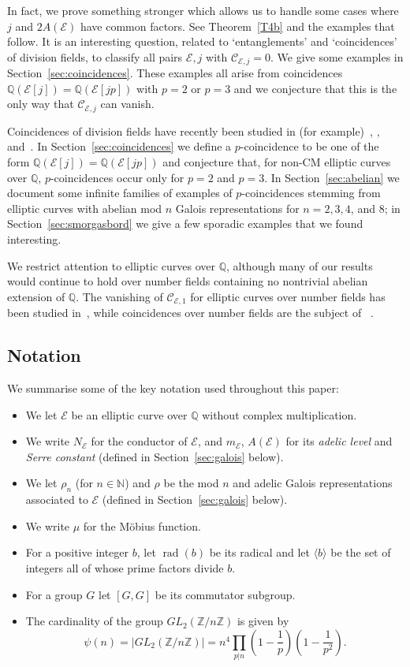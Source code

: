 \documentclass{amsart}
\theoremstyle{plain}
\theoremstyle{remark}
\newcommand{\N}{\mathbb{N}}
\newcommand{\Q}{\mathbb{Q}}
\newcommand{\Z}{\mathbb{Z}}
\newcommand{\E}{\mathcal{E}}
\newcommand{\Cc}{\mathcal{C}}
\DeclareMathOperator{\rad}{\mathrm{rad}}
\begin{document}
In fact, we prove something stronger which allows us to handle some cases where $j$ and $2A(\E)$ have common
factors. See Theorem~\ref{T4b} and the examples that follow. It is an interesting question, related to `entanglements'
and `coincidences' of division fields, to classify all pairs $\E, j$ with $\Cc_{\E,j} = 0$. We give some examples in
Section~\ref{sec:coincidences}. These examples all arise from coincidences $\Q(\E[j]) = \Q(\E[jp])$ with $p = 2$ or
$p = 3$ and we conjecture that this is the only way that $\Cc_{\E,j}$ can vanish.

Coincidences of division fields have recently been studied in (for example)~\cite{DLZ}, \cite{yvonCoincidencesDivisionFields2025}, and~\cite{danielsCoincidencesNilpotentDivision2026}. In
Section~\ref{sec:coincidences} we define a $p$-coincidence to be one of the form $\Q(\E[j]) = \Q(\E[jp])$ and conjecture
that, for non-CM elliptic curves over $\Q$, $p$-coincidences occur only for $p = 2$ and $p = 3$. In
Section~\ref{sec:abelian} we document some infinite families of examples of $p$-coincidences stemming from elliptic
curves with abelian mod $n$ Galois representations for $n = 2, 3, 4$, and $8$; in Section~\ref{sec:smorgasbord} we give
a few sporadic examples that we found interesting.

We restrict attention to elliptic curves over $\Q$, although many of our results would continue to hold over number
fields containing no nontrivial abelian extension of $\Q$. The vanishing of $\Cc_{\E,1}$ for elliptic curves over number fields has
been studied in~\cite{campagna_cyclic_2023}, while coincidences over number fields are the subject of
~\cite{yvonCoincidencesDivisionFields2025}.

\subsection{Notation}
We summarise some of the key notation used throughout this paper:
\begin{itemize}
    \item We let $\E$ be an elliptic curve over $\Q$ without complex multiplication.
    \item We write $N_\E$ for the conductor of $\E$, and $m_\E$, $A(\E)$ for its \emph{adelic level} and \emph{Serre constant} (defined in Section~\ref{sec:galois} below).
    \item We let $\rho_n$ (for $n \in \N$) and $\rho$ be the mod $n$ and adelic Galois representations associated to $\E$ (defined in Section~\ref{sec:galois} below). 
    \item We write $\mu$ for the M\"{o}bius function.
    \item For a positive integer $b$, let $\rad(b)$ be its radical and let $\langle b \rangle$ be the set of integers all of whose prime factors divide $b$.
    \item For a group $G$ let $[G,G]$ be its commutator subgroup.
    \item The cardinality of the group $GL_{2}(\mathbb{Z}/n\mathbb{Z})$ is given by \[\psi(n) = |GL_2(\Z/n\Z)| = n^4 \prod_{p|n} \left(1-\frac{1}{p}\right) \left(1-\frac{1}{p^2}\right).\]
\end{itemize}
\end{document}
